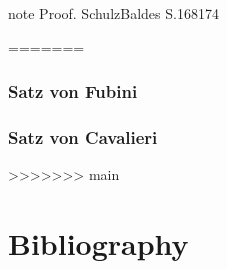 \documentclass[letterpaper,10pt,english]{jupyterBook}
\begin{document}
\begin{sphinxadmonition}{note}
\sphinxAtStartPar
Proof. Schulz\sphinxhyphen{}Baldes S.168\sphinxhyphen{}174
\end{sphinxadmonition}

=======

\subsection{Satz von Fubini}
\label{\detokenize{masstheorie/integrationstechnik:satz-von-fubini}}

\subsection{Satz von Cavalieri}
\label{\detokenize{masstheorie/integrationstechnik:satz-von-cavalieri}}
>>>>>>> main

\chapter{Bibliography}
\label{\detokenize{references:bibliography}}\label{\detokenize{references::doc}}
\sphinxAtStartPar
\end{document}
